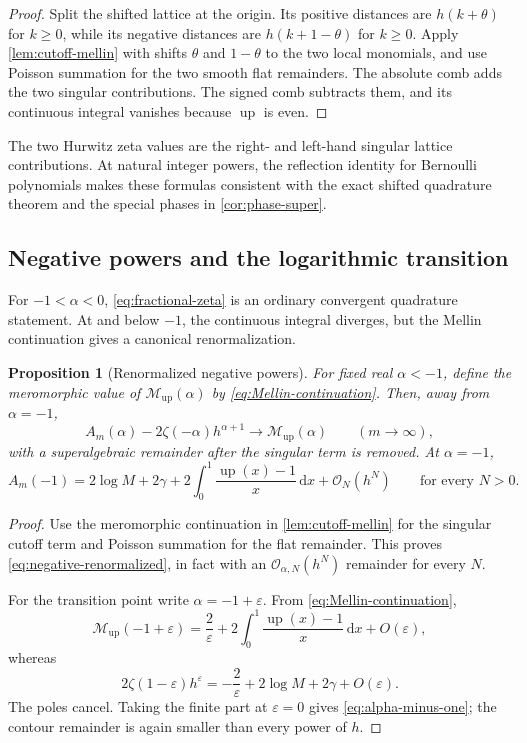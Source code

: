 \documentclass[11pt]{article}
\newtheorem{proposition}[theorem]{Proposition}
\theoremstyle{definition}
\newcommand{\Up}{\operatorname{up}}
\newcommand{\dd}{\,\mathrm{d}}
\newcommand{\Mell}{\mathcal{M}}
\newcommand{\bigO}{\mathcal{O}}
\begin{document}
\begin{proof}
Split the shifted lattice at the origin.  Its positive distances are
$h(k+\theta)$ for $k\ge0$, while its negative distances are
$h(k+1-\theta)$ for $k\ge0$.  Apply
\cref{lem:cutoff-mellin} with shifts $\theta$ and $1-\theta$ to the two local
monomials, and use Poisson summation for the two smooth flat remainders.  The
absolute comb adds the two singular contributions.  The signed comb
subtracts them, and its continuous integral vanishes because $\Up$ is even.
\end{proof}

The two Hurwitz zeta values are the right- and left-hand singular lattice
contributions.  At natural integer powers, the reflection identity for
Bernoulli polynomials makes these formulas consistent with the exact shifted
quadrature theorem and the special phases in \cref{cor:phase-super}.

\subsection{Negative powers and the logarithmic transition}

For $-1<\alpha<0$, \eqref{eq:fractional-zeta} is an ordinary convergent
quadrature statement.  At and below $-1$, the continuous integral diverges,
but the Mellin continuation gives a canonical renormalization.

\begin{proposition}[Renormalized negative powers]
\label{prop:negative-powers}
For fixed real $\alpha<-1$, define the meromorphic value of
$\Mell_{\Up}(\alpha)$ by \eqref{eq:Mellin-continuation}.  Then, away from
$\alpha=-1$,
\begin{equation}
 A_m(\alpha)-2\zeta(-\alpha)h^{\alpha+1}
 \longrightarrow \Mell_{\Up}(\alpha)
 \qquad(m\to\infty),
 \label{eq:negative-renormalized}
\end{equation}
with a superalgebraic remainder after the singular term is removed.
At $\alpha=-1$,
\begin{equation}
 A_m(-1)
 =2\log M+2\gamma
 +2\int_0^1\frac{\Up(x)-1}{x}\dd x+\bigO_N(h^N)
 \qquad\text{for every }N>0.
 \label{eq:alpha-minus-one}
\end{equation}
\end{proposition}

\begin{proof}
Use the meromorphic continuation in \cref{lem:cutoff-mellin} for the singular
cutoff term and Poisson summation for the flat remainder.  This proves
\eqref{eq:negative-renormalized}, in fact with an $\bigO_{\alpha,N}(h^N)$
remainder for every $N$.

For the transition point write $\alpha=-1+\varepsilon$.  From
\eqref{eq:Mellin-continuation},
\[
 \Mell_{\Up}(-1+\varepsilon)
 =\frac2\varepsilon
 +2\int_0^1\frac{\Up(x)-1}{x}\dd x+O(\varepsilon),
\]
whereas
\[
 2\zeta(1-\varepsilon)h^\varepsilon
 =-\frac2\varepsilon+2\log M+2\gamma+O(\varepsilon).
\]
The poles cancel.  Taking the finite part at $\varepsilon=0$ gives
\eqref{eq:alpha-minus-one}; the contour remainder is again smaller than every
power of $h$.
\end{proof}
\end{document}
